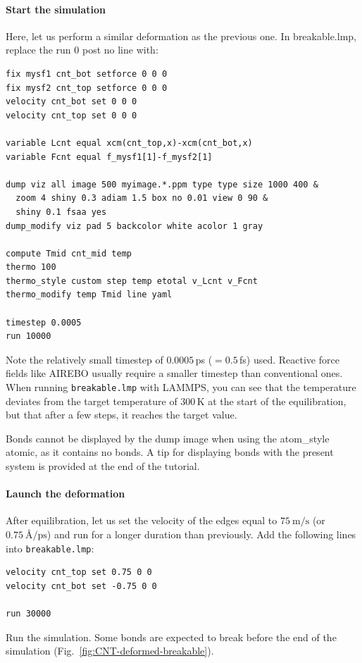 \documentclass[9pt,tutorial]{livecoms}
\newcommand{\lmpcmd}[1]{\hspace{0pt}\colorbox{listing}{\textcolor{command}{\small{#1}}}\hspace{0pt}} %
\newcommand{\lmpcmdnote}[1]{\hspace{0pt}\colorbox{note_listing}{\textcolor{command}{\small{#1}}}\hspace{0pt}} %
\newcommand{\flecmd}[1]{\textcolor{command}{\texttt{#1}}} %
\begin{document}
\paragraph{Start the simulation}

Here, let us perform a similar deformation as the previous one.
In \lmpcmd{breakable.lmp}, replace the \lmpcmd{run 0 post no} line with:
\begin{lstlisting}
fix mysf1 cnt_bot setforce 0 0 0
fix mysf2 cnt_top setforce 0 0 0
velocity cnt_bot set 0 0 0
velocity cnt_top set 0 0 0

variable Lcnt equal xcm(cnt_top,x)-xcm(cnt_bot,x)
variable Fcnt equal f_mysf1[1]-f_mysf2[1]

dump viz all image 500 myimage.*.ppm type type size 1000 400 &
  zoom 4 shiny 0.3 adiam 1.5 box no 0.01 view 0 90 &
  shiny 0.1 fsaa yes
dump_modify viz pad 5 backcolor white acolor 1 gray

compute Tmid cnt_mid temp
thermo 100
thermo_style custom step temp etotal v_Lcnt v_Fcnt
thermo_modify temp Tmid line yaml

timestep 0.0005
run 10000
\end{lstlisting}
Note the relatively small timestep of $0.0005$\,ps ($= 0.5$\,fs) used.  Reactive force
fields like AIREBO usually require a smaller timestep than conventional ones.  When running
\flecmd{breakable.lmp} with LAMMPS, you can see that the temperature deviates
from the target temperature of $300\,\text{K}$ at the start of the equilibration,
but that after a few steps, it reaches the target value.

\begin{note}
  Bonds cannot be displayed by the \lmpcmdnote{dump image} when using
  the \lmpcmdnote{atom\_style atomic}, as it contains no bonds.
  A tip for displaying bonds with the present system is provided at
  the end of the tutorial.
\end{note}

\paragraph{Launch the deformation}

After equilibration, let us set the velocity of the edges equal to
$75~\text{m/s}$ (or $0.75~\text{\AA{}/ps}$) and run for a longer duration than
previously.  Add the following lines into \flecmd{breakable.lmp}:
\begin{lstlisting}
velocity cnt_top set 0.75 0 0
velocity cnt_bot set -0.75 0 0

run 30000
\end{lstlisting}
Run the simulation.  Some bonds are expected to break before the end of the
simulation (Fig.~\ref{fig:CNT-deformed-breakable}).
\end{document}
